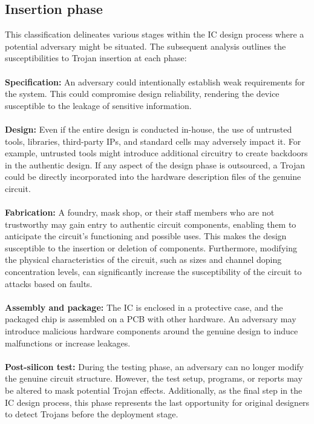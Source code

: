 \subsection{Insertion phase}
This classification delineates various stages within the IC design process where a potential adversary might be situated. The subsequent analysis outlines the susceptibilities to Trojan insertion at each phase:
\paragraph*{}
\textbf{Specification:} An adversary could intentionally establish weak requirements for the system. This could compromise design reliability, rendering the device susceptible to the leakage of sensitive information.
\paragraph*{}
\textbf{Design:} Even if the entire design is conducted in-house, the use of untrusted tools, libraries, third-party IPs, and standard cells may adversely impact it. For example, untrusted tools might introduce additional circuitry to create backdoors in the authentic design. If any aspect of the design phase is outsourced, a Trojan could be directly incorporated into the hardware description files of the genuine circuit.
\paragraph*{}
\textbf{Fabrication:} A foundry, mask shop, or their staff members who are not trustworthy may gain entry to authentic circuit components, enabling them to anticipate the circuit's functioning and possible uses. This makes the design susceptible to the insertion or deletion of components. Furthermore, modifying the physical characteristics of the circuit, such as sizes and channel doping concentration levels, can significantly increase the susceptibility of the circuit to attacks based on faults.
\paragraph*{}
\textbf{Assembly and package:} The IC is enclosed in a protective case, and the packaged chip is assembled on a PCB with other hardware. An adversary may introduce malicious hardware components around the genuine design to induce malfunctions or increase leakages.
\paragraph*{}
\textbf{Post-silicon test:} During the testing phase, an adversary can no longer modify the genuine circuit structure. However, the test setup, programs, or reports may be altered to mask potential Trojan effects. Additionally, as the final step in the IC design process, this phase represents the last opportunity for original designers to detect Trojans before the deployment stage.

